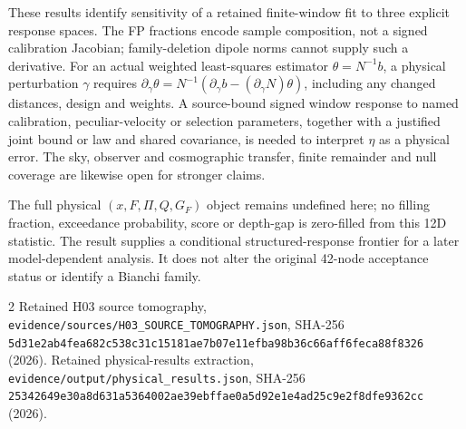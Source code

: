 \documentclass[aps,prd,reprint,onecolumn,superscriptaddress,nofootinbib]{revtex4-2}
\begin{document}
These results identify sensitivity of a retained finite-window fit to three explicit response spaces. The FP fractions encode sample composition, not a signed calibration Jacobian; family-deletion dipole norms cannot supply such a derivative. For an actual weighted least-squares estimator $\theta=N^{-1}b$, a physical perturbation $\gamma$ requires $\partial_\gamma\theta=N^{-1}(\partial_\gamma b-(\partial_\gamma N)\theta)$, including any changed distances, design and weights. A source-bound signed window response to named calibration, peculiar-velocity or selection parameters, together with a justified joint bound or law and shared covariance, is needed to interpret $\eta$ as a physical error. The sky, observer and cosmographic transfer, finite remainder and null coverage are likewise open for stronger claims.

The full physical $(x,F,\Pi,Q,G_F)$ object remains undefined here; no filling fraction, exceedance probability, score or depth-gap is zero-filled from this 12D statistic. The result supplies a conditional structured-response frontier for a later model-dependent analysis. It does not alter the original 42-node acceptance status or identify a Bianchi family.

\begin{thebibliography}{2}
 Retained H03 source tomography, \texttt{evidence/sources/H03\_SOURCE\_TOMOGRAPHY.json}, SHA-256 \texttt{5d31e2ab4fea682c538c31c15181ae7b07e11efba98b36c66aff6feca88f8326} (2026).
 Retained physical-results extraction, \texttt{evidence/output/physical\_results.json}, SHA-256 \texttt{25342649e30a8d631a5364002ae39ebffae0a5d92e1e4ad25c9e2f8dfe9362cc} (2026).
\end{thebibliography}
\end{document}
